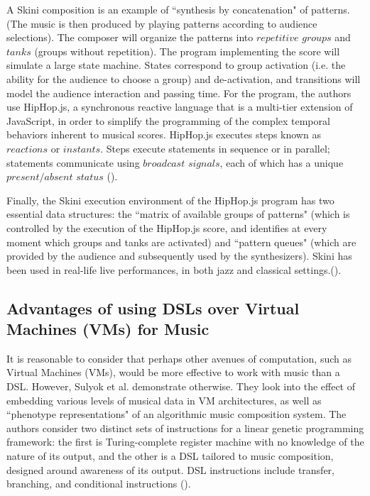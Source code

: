 \documentclass{report}
\newcommand\citeparen[1]{(\cite{#1})}
\begin{document}
A Skini composition is an example of  ``synthesis by concatenation" of patterns. (The music is then produced by playing patterns  according to audience  selections). The composer will organize the patterns into $repetitive$ $groups$ and $tanks$  (groups  without repetition). The program implementing the score will simulate a  large  state machine. States correspond  to group  activation (i.e. the ability for the audience to choose a group)  and de-activation, and transitions will  model the audience interaction and passing time. For the program, the authors use HipHop.js, a synchronous reactive language that is a multi-tier extension of  JavaScript, in order to simplify the programming of the complex  temporal behaviors  inherent to musical scores. HipHop.js executes  steps known as  $reactions$ or $instants$. Steps execute statements in  sequence or  in parallel; statements  communicate using $broadcast$ $signals$,  each of which has a unique  $present/absent$ $status$ \citeparen{petit_serrano_2020}.

Finally, the Skini  execution  environment of the  HipHop.js program has two  essential  data structures: the ``matrix of  available groups of patterns" (which is controlled by the execution of the  HipHop.js score, and identifies  at every moment which groups and  tanks  are activated) and  ``pattern  queues" (which are provided by the audience and subsequently used by the synthesizers). Skini has been used in real-life  live  performances,  in  both jazz and classical settings.\citeparen{petit_serrano_2020}.

\subsection{Advantages of using DSLs over Virtual Machines (VMs) for Music}
It is reasonable to consider that perhaps other avenues of computation, such as Virtual Machines (VMs), would be more effective to work with music than a DSL. However, Sulyok et al. demonstrate otherwise. They look into the effect  of embedding  various  levels of musical data in VM architectures, as well as ``phenotype  representations"  of an algorithmic music composition system.  The  authors consider two distinct sets of instructions  for  a  linear genetic  programming  framework: the  first  is Turing-complete register machine with no knowledge of the nature of its  output,  and the other is a  DSL tailored to music composition, designed  around awareness  of its  output. DSL instructions include transfer,   branching, and conditional  instructions \citeparen{sulyok_harte_bodo_2019}.
\end{document}
